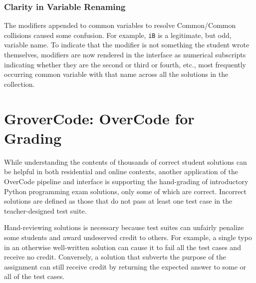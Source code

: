 \documentclass[12pt,twoside]{mitthesis}
\begin{document}

\subsubsection{Clarity in Variable Renaming}
The modifiers appended to common variables to resolve Common/Common collisions caused some confusion. For example, \texttt{iB} is a legitimate, but odd, variable name. To indicate that the modifier is not something the student wrote themselves, modifiers are now rendered in the interface as numerical subscripts indicating whether they are the second or third or fourth, etc., most frequently occurring common variable with that name across all the solutions in the collection.

\section{GroverCode: OverCode for Grading}\label{sec:grover}

While understanding the contents of thousands of correct student solutions can be helpful in both residential and online contexts, another application of the OverCode pipeline and interface is supporting the hand-grading of introductory Python programming exam solutions, only some of which are correct. Incorrect solutions are defined as those that do not pass at least one test case in the teacher-designed test suite.

Hand-reviewing solutions is necessary because test suites can unfairly penalize some students and award undeserved credit to others. For example, a single typo in an otherwise well-written solution can cause it to fail all the test cases and receive no credit. Conversely, a solution that subverts the purpose of the assignment can still receive credit by returning the expected answer to some or all of the test cases.
\end{document}
